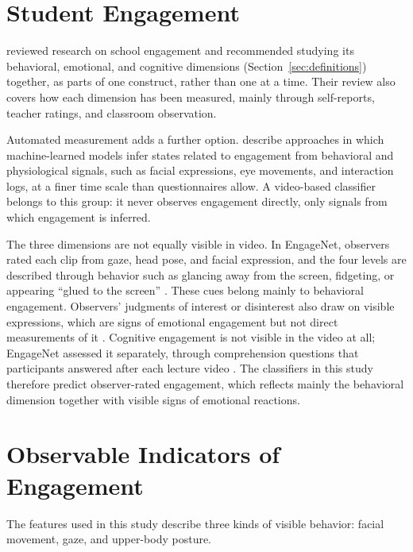 
\section{Student Engagement}
\label{sec:engagement}

 reviewed research on school engagement and recommended studying its behavioral, emotional, and cognitive dimensions (Section~\ref{sec:definitions}) together, as parts of one construct, rather than one at a time. Their review also covers how each dimension has been measured, mainly through self-reports, teacher ratings, and classroom observation.

Automated measurement adds a further option.  describe approaches in which machine-learned models infer states related to engagement from behavioral and physiological signals, such as facial expressions, eye movements, and interaction logs, at a finer time scale than questionnaires allow. A video-based classifier belongs to this group: it never observes engagement directly, only signals from which engagement is inferred.

The three dimensions are not equally visible in video. In EngageNet, observers rated each clip from gaze, head pose, and facial expression, and the four levels are described through behavior such as glancing away from the screen, fidgeting, or appearing ``glued to the screen'' \cite{singh2023}. These cues belong mainly to behavioral engagement. Observers' judgments of interest or disinterest also draw on visible expressions, which are signs of emotional engagement but not direct measurements of it \cite{barrett2019}. Cognitive engagement is not visible in the video at all; EngageNet assessed it separately, through comprehension questions that participants answered after each lecture video \cite{singh2023}. The classifiers in this study therefore predict observer-rated engagement, which reflects mainly the behavioral dimension together with visible signs of emotional reactions.



\section{Observable Indicators of Engagement}
\label{sec:indicators}

The features used in this study describe three kinds of visible behavior: facial movement, gaze, and upper-body posture.


